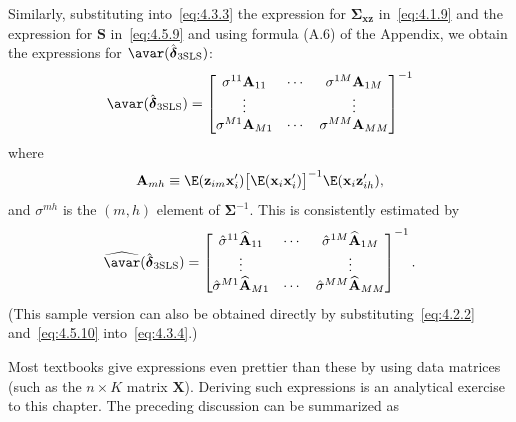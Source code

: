 Similarly, substituting into~\eqref{eq:4.3.3} the expression for
$\boldsymbol{\Sigma}_{\mathbf{xz}}$ in~\eqref{eq:4.1.9} and the expression
for $\mathbf{S}$ in~\eqref{eq:4.5.9} and using formula (A.6) of the Appendix,
we obtain the expressions for $\avar(\hat{\boldsymbol{\delta}}_{\mathrm{3SLS}})$:
\begin{equation}
\avar(\hat{\boldsymbol{\delta}}_{\mathrm{3SLS}})
= \begin{bmatrix}
\sigma^{11} \mathbf{A}_{11} & \cdots & \sigma^{1M} \mathbf{A}_{1M} \\
\vdots & & \vdots \\
\sigma^{M1} \mathbf{A}_{M1} & \cdots & \sigma^{MM} \mathbf{A}_{MM}
\end{bmatrix}^{-1}
\label{eq:4.5.15}
\end{equation}
where
\begin{equation}
\mathbf{A}_{mh} \equiv \E(\mathbf{z}_{im} \mathbf{x}_i')
\bigl[\E(\mathbf{x}_i \mathbf{x}_i')\bigr]^{-1}
\E(\mathbf{x}_i \mathbf{z}_{ih}'),
\label{eq:4.5.16}
\end{equation}
and $\sigma^{mh}$ is the $(m,h)$ element of $\boldsymbol{\Sigma}^{-1}$.
This is consistently estimated by
\begin{equation}
\widehat{\avar}(\hat{\boldsymbol{\delta}}_{\mathrm{3SLS}})
= \begin{bmatrix}
\hat{\sigma}^{11} \widehat{\mathbf{A}}_{11} & \cdots &
\hat{\sigma}^{1M} \widehat{\mathbf{A}}_{1M} \\
\vdots & & \vdots \\
\hat{\sigma}^{M1} \widehat{\mathbf{A}}_{M1} & \cdots &
\hat{\sigma}^{MM} \widehat{\mathbf{A}}_{MM}
\end{bmatrix}^{-1}.
\label{eq:4.5.17}
\end{equation}
(This sample version can also be obtained directly by substituting~\eqref{eq:4.2.2}
and~\eqref{eq:4.5.10} into~\eqref{eq:4.3.4}.)

Most textbooks give expressions even prettier than these by using data matrices
(such as the $n \times K$ matrix $\mathbf{X}$). Deriving such expressions is an analytical
exercise to this chapter. The preceding discussion can be summarized as

